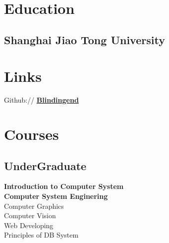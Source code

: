\documentclass[]{deedy-resume-openfont}
\begin{document}
%
%
\lastupdated

%
%

%
%

\begin{minipage}[t]{0.3\textwidth} 


\section{Education} 
\sectionsep

\subsection{Shanghai Jiao Tong University}
\sectionsep


\section{Links}
\sectionsep
Github:// \href{https://github.com/Blindingend}{\bf Blindingend} \\
\sectionsep


\section{Courses}
\sectionsep
\subsection{UnderGraduate}
\textbf{Introduction to Computer System} \\
\textbf{Computer System Enginering} \\
Computer Graphics \\
Computer Vision \\
Web Developing \\
Principles of DB System  \\
\sectionsep


\end{minipage}
\end{document}
